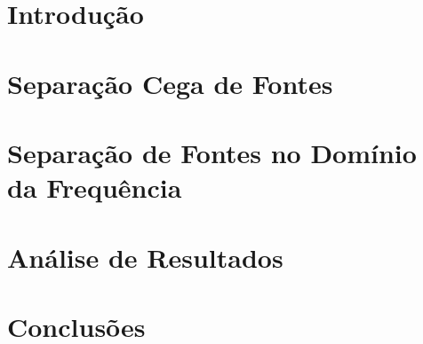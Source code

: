 \documentclass[a4paper,12pt,oneside,openany]{book}
\begin{document}
\frontmatter
\thispagestyle{empty}



\pagebreak            



\tableofcontents
\listoffigures
\listoftables

\mainmatter
\cleardoublepage
\chapter{Introdução}
\label{cap1}


\chapter{Separação Cega de Fontes}
\label{cap2}


\chapter{Separação de Fontes no Domínio da Frequência}
\label{cap3}


\chapter{Análise de Resultados}
\label{cap4}


\chapter{Conclusões}
\label{cap5}



\normalsize
\cleardoublepage
{}



\backmatter
\end{document}
